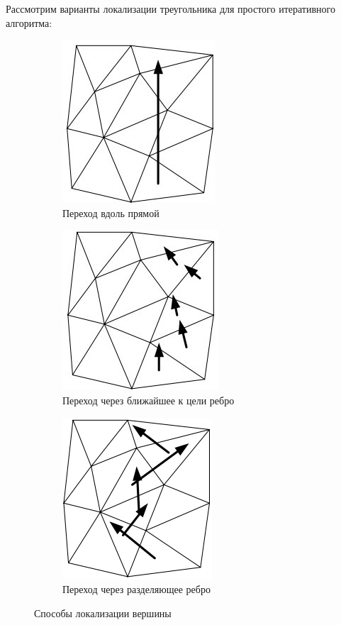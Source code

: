 \documentclass{fefu}
\begin{document}
 Рассмотрим варианты локализации треугольника для простого итеративного алгоритма:
\begin{figure}[H]
    \centering
    \begin{subfigure}[t]{.3\linewidth}
    \includegraphics[scale=0.8]{images/ThrougSegmentIntersection.jpg}
        \caption{Переход вдоль прямой}
        \label{LineThrough}
    \end{subfigure}
    \begin{subfigure}[t]{.3\linewidth}
    \includegraphics[scale=0.8]{images/ClosestEdge.jpg}
        \caption{Переход через ближайшее к цели ребро}
        \label{ClosestEdge}
    \end{subfigure}
    \begin{subfigure}[t]{.3\linewidth}
    \includegraphics[scale=0.8]{images/SeparatingEdge.png}
        \caption{Переход через разделяющее ребро}
        \label{SeparatingEdge}
    \end{subfigure}
    \caption{Способы локализации вершины}
    \label{VertexLocalization}
\end{figure}
\end{document}
